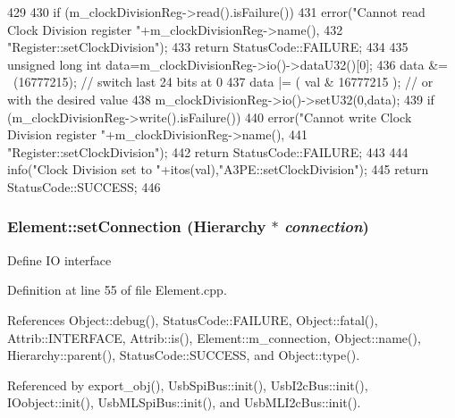 \begin{DoxyCode}
429                                                  {
430   if (m_clockDivisionReg->read().isFailure()){
431     error("Cannot read Clock Division register "+m_clockDivisionReg->name(),
432         "Register::setClockDivision");
433     return StatusCode::FAILURE;
434   }
435   unsigned long int data=m_clockDivisionReg->io()->dataU32()[0];
436   data &= ~(16777215); // switch last 24 bits at 0
437   data |= ( val & 16777215 );   // or with the desired value
438   m_clockDivisionReg->io()->setU32(0,data);
439   if (m_clockDivisionReg->write().isFailure()){
440     error("Cannot write Clock Division register "+m_clockDivisionReg->name(),
441         "Register::setClockDivision");
442     return StatusCode::FAILURE;
443   }
444   info("Clock Division set to "+itos(val),"A3PE::setClockDivision");
445   return StatusCode::SUCCESS;
446 }
\end{DoxyCode}
\hypertarget{classElement_ab476b4b1df5954141ceb14f072433b89}{
\subsubsection[{setConnection}]{ Element::setConnection ({\bf Hierarchy} $\ast$ {\em connection})}}
\label{classElement_ab476b4b1df5954141ceb14f072433b89}
Define IO interface 

Definition at line 55 of file Element.cpp.

References Object::debug(), StatusCode::FAILURE, Object::fatal(), Attrib::INTERFACE, Attrib::is(), Element::m\_\-connection, Object::name(), Hierarchy::parent(), StatusCode::SUCCESS, and Object::type().

Referenced by export\_\-obj(), UsbSpiBus::init(), UsbI2cBus::init(), IOobject::init(), UsbMLSpiBus::init(), and UsbMLI2cBus::init().


